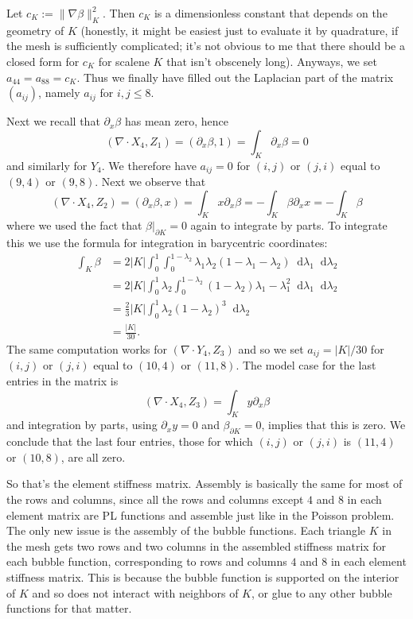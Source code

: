 \documentclass[10pt]{article}
\newcommand*\dif{\mathop{}\!\mathrm{d}}
\theoremstyle{definition}
\begin{document}
Let $c_K := \|\nabla \beta\|_K^2$.
Then $c_K$ is a dimensionless constant that depends on the geometry of $K$ (honestly, it might be easiest just to evaluate it by quadrature, if the mesh is sufficiently complicated; it's not obvious to me that there should be a closed form for $c_K$ for scalene $K$ that isn't obscenely long).
Anyways, we set $a_{44} = a_{88} = c_K$. Thus we finally have filled out the Laplacian part of the matrix $(a_{ij})$, namely $a_{ij}$ for $i, j \leq 8$.

Next we recall that $\partial_x \beta$ has mean zero, hence 
$$(\nabla \cdot X_4, Z_1) = (\partial_x \beta, 1) = \int_K \partial_x \beta = 0$$
and similarly for $Y_4$. We therefore have $a_{ij} = 0$ for $(i,j)$ or $(j,i)$ equal to $(9, 4)$ or $(9, 8)$.
Next we observe that 
$$(\nabla \cdot X_4, Z_2) = (\partial_x \beta, x) = \int_K x \partial_x \beta = -\int_K \beta \partial_x x = -\int_K \beta$$
where we used the fact that $\beta|_{\partial K} = 0$ again to integrate by parts.
To integrate this we use the formula for integration in barycentric coordinates:
\begin{align*}
    \int_K \beta 
    &= 2|K| \int_0^1 \int_0^{1 - \lambda_2} \lambda_1 \lambda_2 (1 - \lambda_1 - \lambda_2) \dif \lambda_1 \dif \lambda_2 \\
    &= 2|K| \int_0^1 \lambda_2 \int_0^{1 - \lambda_2} (1 - \lambda_2) \lambda_1 - \lambda_1^2 \dif \lambda_1 \dif \lambda_2 \\
    &= \frac{2}{3} |K| \int_0^1 \lambda_2(1 - \lambda_2)^3 \dif \lambda_2 \\
    &= \frac{|K|}{30}.
\end{align*}
The same computation works for $(\nabla \cdot Y_4, Z_3)$ and so we set $a_{ij} = |K|/30$ for $(i,j)$ or $(j,i)$ equal to $(10, 4)$ or $(11, 8)$.
The model case for the last entries in the matrix is
$$(\nabla \cdot X_4, Z_3) = \int_K y \partial_x \beta$$
and integration by parts, using $\partial_x y = 0$ and $\beta_{\partial K} = 0$, implies that this is zero. We conclude that the last four entries, those for which $(i,j)$ or $(j,i)$ is $(11, 4)$ or $(10, 8)$, are all zero.

So that's the element stiffness matrix.
Assembly is basically the same for most of the rows and columns, since all the rows and columns except $4$ and $8$ in each element matrix are PL functions and assemble just like in the Poisson problem.
The only new issue is the assembly of the bubble functions.
Each triangle $K$ in the mesh gets two rows and two columns in the assembled stiffness matrix for each bubble function, corresponding to rows and columns $4$ and $8$ in each element stiffness matrix.
This is because the bubble function is supported on the interior of $K$ and so does not interact with neighbors of $K$, or glue to any other bubble functions for that matter.
\end{document}
